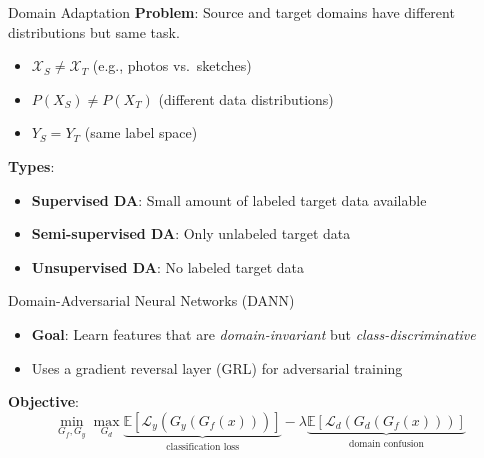 \documentclass[11pt]{beamer}
\begin{document}
\begin{frame}{Domain Adaptation}
    \textbf{Problem}: Source and target domains have different distributions but same task.
    \begin{itemize}
        \item $\mathcal{X}_S \neq \mathcal{X}_T$ (e.g., photos vs.\ sketches)
        \item $P(X_S) \neq P(X_T)$ (different data distributions)
        \item $Y_S = Y_T$ (same label space)
    \end{itemize}
    \vfill
    \textbf{Types}:
    \begin{itemize}
        \item \textbf{Supervised DA}: Small amount of labeled target data available
        \item \textbf{Semi-supervised DA}: Only unlabeled target data
        \item \textbf{Unsupervised DA}: No labeled target data
    \end{itemize}
\end{frame}

\begin{frame}{Domain-Adversarial Neural Networks (DANN)}
    \begin{itemize}
        \item \textbf{Goal}: Learn features that are \emph{domain-invariant} but \emph{class-discriminative}
        \item Uses a gradient reversal layer (GRL) for adversarial training
    \end{itemize}
    \centering
    \vspace{0.5em}

    \textbf{Objective}:
    \[
        \min_{G_f, G_y} \max_{G_d} \underbrace{\mathbb{E}[\mathcal{L}_y(G_y(G_f(x)))]}_{\text{classification loss}} - \lambda \underbrace{\mathbb{E}[\mathcal{L}_d(G_d(G_f(x)))]}_{\text{domain confusion}}
    \]
\end{frame}
\end{document}

